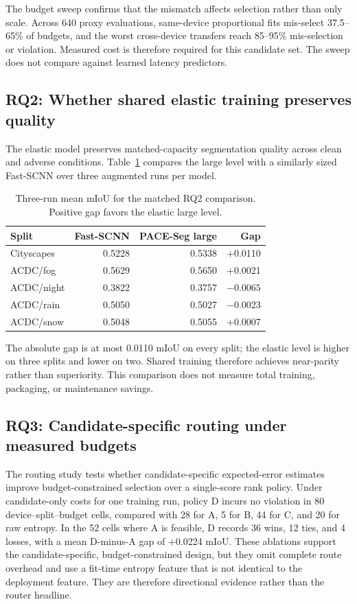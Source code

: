 \documentclass[a4paper,review,12pt]{elsarticle}
\newcommand{\method}{PACE-Seg}
\newcommand{\miou}{mIoU}
\begin{document}


The budget sweep confirms that the mismatch affects selection rather than only scale. Across 640 proxy evaluations, same-device proportional fits mis-select 37.5--65\% of budgets, and the worst cross-device transfers reach 85--95\% mis-selection or violation. Measured cost is therefore required for this candidate set. The sweep does not compare against learned latency predictors.

\subsection{RQ2: Whether shared elastic training preserves quality}

The elastic model preserves matched-capacity segmentation quality across clean and adverse conditions. Table~\ref{tab:rq2} compares the large level with a similarly sized Fast-SCNN over three augmented runs per model.

\begin{table}[t]
\centering
\caption{Three-run mean \miou{} for the matched RQ2 comparison. Positive gap favors the elastic large level.}
\label{tab:rq2}
\begin{tabular}{@{}lrrr@{}}
\toprule
Split & Fast-SCNN & \method{} large & Gap \\
\midrule
Cityscapes & 0.5228 & 0.5338 & +0.0110 \\
ACDC/fog & 0.5629 & 0.5650 & +0.0021 \\
ACDC/night & 0.3822 & 0.3757 & $-0.0065$ \\
ACDC/rain & 0.5050 & 0.5027 & $-0.0023$ \\
ACDC/snow & 0.5048 & 0.5055 & +0.0007 \\
\bottomrule
\end{tabular}
\end{table}

The absolute gap is at most 0.0110 \miou{} on every split; the elastic level is higher on three splits and lower on two. Shared training therefore achieves near-parity rather than superiority. This comparison does not measure total training, packaging, or maintenance savings.

\subsection{RQ3: Candidate-specific routing under measured budgets}

The routing study tests whether candidate-specific expected-error estimates improve budget-constrained selection over a single-score rank policy. Under candidate-only costs for one training run, policy D incurs no violation in 80 device--split--budget cells, compared with 28 for A, 5 for B, 44 for C, and 20 for raw entropy. In the 52 cells where A is feasible, D records 36 wins, 12 ties, and 4 losses, with a mean D-minus-A gap of +0.0224 \miou{}. These ablations support the candidate-specific, budget-constrained design, but they omit complete route overhead and use a fit-time entropy feature that is not identical to the deployment feature. They are therefore directional evidence rather than the router headline.
\end{document}

